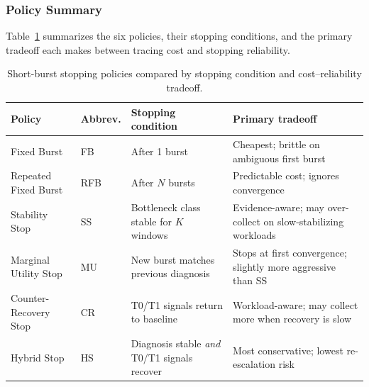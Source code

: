 \subsubsection{Policy Summary}

Table~\ref{tab:policies} summarizes the six policies, their stopping conditions, and the primary tradeoff each makes between tracing cost and stopping reliability.

\begin{table}
\centering
\caption{Short-burst stopping policies compared by stopping condition and cost--reliability tradeoff.}
\label{tab:policies}
\footnotesize
\setlength{\tabcolsep}{4pt}
\renewcommand{\arraystretch}{0.95}
\begin{tabularx}{\textwidth}{@{}l l >{\raggedright\arraybackslash}X >{\raggedright\arraybackslash}X@{}}
\toprule
\textbf{Policy} & \textbf{Abbrev.} & \textbf{Stopping condition} & \textbf{Primary tradeoff} \\
\midrule
Fixed Burst           & \textsc{FB}  & After 1 burst                                      & Cheapest; brittle on ambiguous first burst \\
Repeated Fixed Burst  & \textsc{RFB} & After $N$ bursts                                   & Predictable cost; ignores convergence \\
Stability Stop        & \textsc{SS}  & Bottleneck class stable for $K$ windows            & Evidence-aware; may over-collect on slow-stabilizing workloads \\
Marginal Utility Stop & \textsc{MU}  & New burst matches previous diagnosis               & Stops at first convergence; slightly more aggressive than \textsc{SS} \\
Counter-Recovery Stop & \textsc{CR}  & T0/T1 signals return to baseline                   & Workload-aware; may collect more when recovery is slow \\
Hybrid Stop           & \textsc{HS}  & Diagnosis stable \emph{and} T0/T1 signals recover  & Most conservative; lowest re-escalation risk \\
\bottomrule
\end{tabularx}
\end{table}




